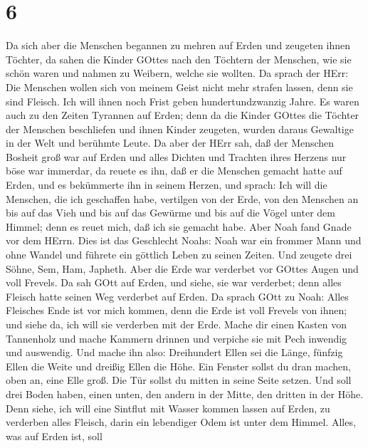 \hypertarget{section-5}{%
\section{6}\label{section-5}}

 Da sich aber die Menschen begannen zu mehren auf Erden und
zeugeten ihnen Töchter,  da sahen die Kinder GOttes nach den
Töchtern der Menschen, wie sie schön waren und nahmen zu Weibern, welche
sie wollten.  Da sprach der HErr: Die Menschen wollen sich
von meinem Geist nicht mehr strafen lassen, denn sie sind Fleisch. Ich
will ihnen noch Frist geben hundertundzwanzig Jahre.  Es
waren auch zu den Zeiten Tyrannen auf Erden; denn da die Kinder GOttes
die Töchter der Menschen beschliefen und ihnen Kinder zeugeten, wurden
daraus Gewaltige in der Welt und berühmte Leute.  Da aber
der HErr sah, daß der Menschen Bosheit groß war auf Erden und alles
Dichten und Trachten ihres Herzens nur böse war immerdar, 
da reuete es ihn, daß er die Menschen gemacht hatte auf Erden, und es
bekümmerte ihn in seinem Herzen,  und sprach: Ich will die
Menschen, die ich geschaffen habe, vertilgen von der Erde, von den
Menschen an bis auf das Vieh und bis auf das Gewürme und bis auf die
Vögel unter dem Himmel; denn es reuet mich, daß ich sie gemacht habe.
 Aber Noah fand Gnade vor dem HErrn.  Dies ist
das Geschlecht Noahs: Noah war ein frommer Mann und ohne Wandel und
führete ein göttlich Leben zu seinen Zeiten.  Und zeugete
drei Söhne, Sem, Ham, Japheth.  Aber die Erde war verderbet
vor GOttes Augen und voll Frevels.  Da sah GOtt auf Erden,
und siehe, sie war verderbet; denn alles Fleisch hatte seinen Weg
verderbet auf Erden.  Da sprach GOtt zu Noah: Alles
Fleisches Ende ist vor mich kommen, denn die Erde ist voll Frevels von
ihnen; und siehe da, ich will sie verderben mit der Erde. 
Mache dir einen Kasten von Tannenholz und mache Kammern drinnen und
verpiche sie mit Pech inwendig und auswendig.  Und mache
ihn also: Dreihundert Ellen sei die Länge, fünfzig Ellen die Weite und
dreißig Ellen die Höhe.  Ein Fenster sollst du dran machen,
oben an, eine Elle groß. Die Tür sollst du mitten in seine Seite setzen.
Und soll drei Boden haben, einen unten, den andern in der Mitte, den
dritten in der Höhe.  Denn siehe, ich will eine Sintflut
mit Wasser kommen lassen auf Erden, zu verderben alles Fleisch, darin
ein lebendiger Odem ist unter dem Himmel. Alles, was auf Erden ist, soll
